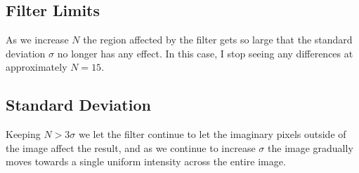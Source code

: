 \subsection{Filter Limits}
As we increase $N$ the region affected by the filter gets so large that the
standard deviation $\sigma$ no longer has any effect. In this case, I stop
seeing any differences at approximately $N=15$.

\subsection{Standard Deviation}
Keeping $N > 3\sigma$ we let the filter continue to let the imaginary pixels
outside of the image affect the result, and as we continue to increase
$\sigma$ the image gradually moves towards a single uniform intensity across
the entire image.

